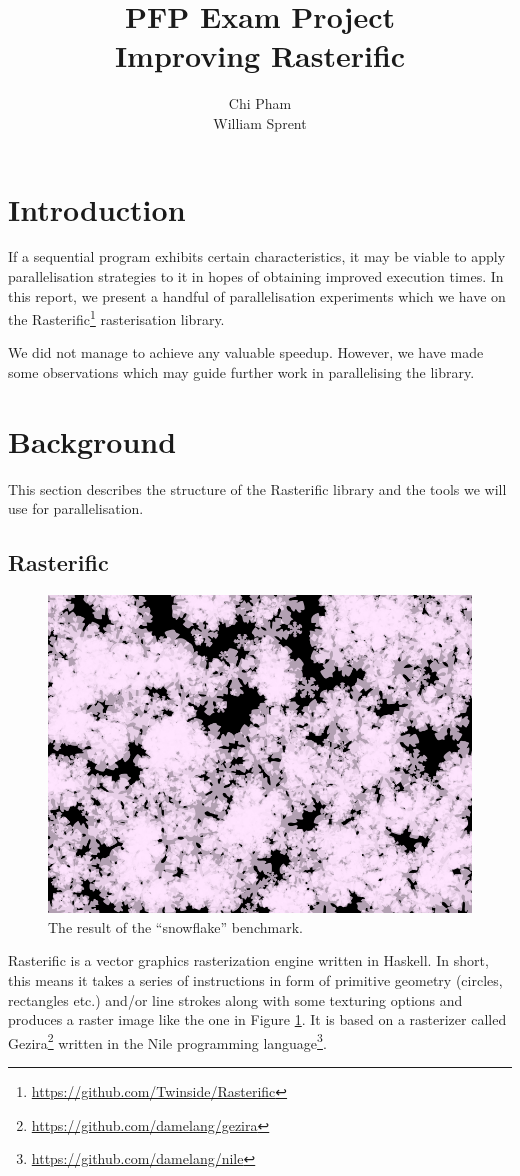 \documentclass[12pt, a4paper]{article}
\begin{document}
\author{Chi Pham\\William Sprent}
\title{PFP Exam Project\\Improving Rasterific}
\maketitle

\tableofcontents
\clearpage

\section{Introduction}
If a sequential program exhibits certain characteristics, it may be viable to apply parallelisation strategies to it in hopes of
 obtaining improved execution times.
In this report, we present a handful of parallelisation experiments which we have 
on the Rasterific\footnote{\url{https://github.com/Twinside/Rasterific}} rasterisation library.

 We did not manage to achieve any valuable speedup. However, we have made some observations which may guide
 further work in parallelising the library.
\section{Background}\label{background}

This section describes the structure of the Rasterific library and the tools we will use for parallelisation.

\subsection{Rasterific}
\begin{figure}[h!]
  \centering
  \includegraphics[width=.4\linewidth]{../flakes}
  \caption{The result of the ``snowflake'' benchmark.}
  \label{fig:snowflakes}
\end{figure}

Rasterific is a vector graphics rasterization engine written in Haskell. In short, this means it takes a series
of instructions in form of primitive geometry (circles, rectangles etc.) and/or line strokes along with some texturing options and produces a raster image like the
 one in Figure \ref{fig:snowflakes}. It is based
 on a rasterizer called Gezira\footnote{\url{https://github.com/damelang/gezira}} written in the Nile programming language\footnote{\url{https://github.com/damelang/nile}}.
\end{document}
